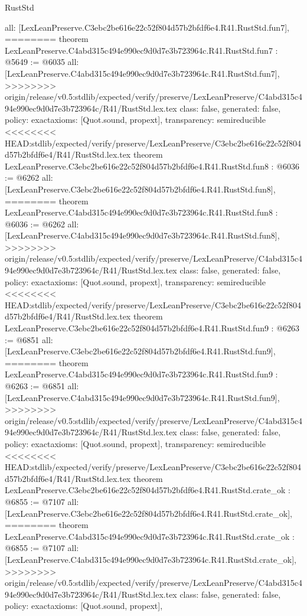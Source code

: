 \begin{lexlean}{RustStd}
\begin{coremodule}
{\begin{coremodule}
{{{{{{{{{{  all: [LexLeanPreserve.C3ebc2be616e22c52f804d57b2bfdf6e4.R41.RustStd.fun7],
========
theorem LexLeanPreserve.C4abd315c494e990ec9d0d7e3b723964c.R41.RustStd.fun7 : @5649 := @6035 {
  all: [LexLeanPreserve.C4abd315c494e990ec9d0d7e3b723964c.R41.RustStd.fun7],
>>>>>>>> origin/release/v0.5:stdlib/expected/verify/preserve/LexLeanPreserve/C4abd315c494e990ec9d0d7e3b723964c/R41/RustStd.lex.tex
  class: false,
  generated: false,
  policy: exact{axioms: [Quot.sound, propext]},
  transparency: semireducible
}
<<<<<<<< HEAD:stdlib/expected/verify/preserve/LexLeanPreserve/C3ebc2be616e22c52f804d57b2bfdf6e4/R41/RustStd.lex.tex
theorem LexLeanPreserve.C3ebc2be616e22c52f804d57b2bfdf6e4.R41.RustStd.fun8 : @6036 := @6262 {
  all: [LexLeanPreserve.C3ebc2be616e22c52f804d57b2bfdf6e4.R41.RustStd.fun8],
========
theorem LexLeanPreserve.C4abd315c494e990ec9d0d7e3b723964c.R41.RustStd.fun8 : @6036 := @6262 {
  all: [LexLeanPreserve.C4abd315c494e990ec9d0d7e3b723964c.R41.RustStd.fun8],
>>>>>>>> origin/release/v0.5:stdlib/expected/verify/preserve/LexLeanPreserve/C4abd315c494e990ec9d0d7e3b723964c/R41/RustStd.lex.tex
  class: false,
  generated: false,
  policy: exact{axioms: [Quot.sound, propext]},
  transparency: semireducible
}
<<<<<<<< HEAD:stdlib/expected/verify/preserve/LexLeanPreserve/C3ebc2be616e22c52f804d57b2bfdf6e4/R41/RustStd.lex.tex
theorem LexLeanPreserve.C3ebc2be616e22c52f804d57b2bfdf6e4.R41.RustStd.fun9 : @6263 := @6851 {
  all: [LexLeanPreserve.C3ebc2be616e22c52f804d57b2bfdf6e4.R41.RustStd.fun9],
========
theorem LexLeanPreserve.C4abd315c494e990ec9d0d7e3b723964c.R41.RustStd.fun9 : @6263 := @6851 {
  all: [LexLeanPreserve.C4abd315c494e990ec9d0d7e3b723964c.R41.RustStd.fun9],
>>>>>>>> origin/release/v0.5:stdlib/expected/verify/preserve/LexLeanPreserve/C4abd315c494e990ec9d0d7e3b723964c/R41/RustStd.lex.tex
  class: false,
  generated: false,
  policy: exact{axioms: [Quot.sound, propext]},
  transparency: semireducible
}
<<<<<<<< HEAD:stdlib/expected/verify/preserve/LexLeanPreserve/C3ebc2be616e22c52f804d57b2bfdf6e4/R41/RustStd.lex.tex
theorem LexLeanPreserve.C3ebc2be616e22c52f804d57b2bfdf6e4.R41.RustStd.crate_ok : @6855 := @7107 {
  all: [LexLeanPreserve.C3ebc2be616e22c52f804d57b2bfdf6e4.R41.RustStd.crate_ok],
========
theorem LexLeanPreserve.C4abd315c494e990ec9d0d7e3b723964c.R41.RustStd.crate_ok : @6855 := @7107 {
  all: [LexLeanPreserve.C4abd315c494e990ec9d0d7e3b723964c.R41.RustStd.crate_ok],
>>>>>>>> origin/release/v0.5:stdlib/expected/verify/preserve/LexLeanPreserve/C4abd315c494e990ec9d0d7e3b723964c/R41/RustStd.lex.tex
  class: false,
  generated: false,
  policy: exact{axioms: [Quot.sound, propext]},
}}}}}}}}}}}}}}
\end{coremodule}}
\end{coremodule}
\end{lexlean}
